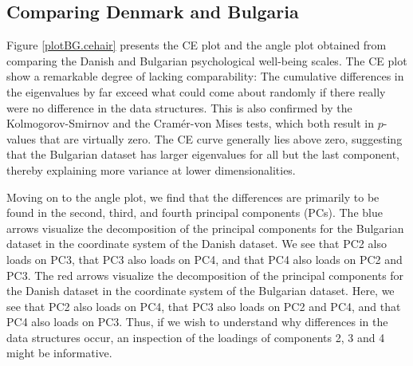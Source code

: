 \documentclass[]{interact}
\theoremstyle{plain}%
\theoremstyle{definition}
\theoremstyle{remark}
\begin{document}
\subsection{Comparing Denmark and Bulgaria}
Figure \ref{plotBG.cehair} presents the CE plot and the angle plot obtained from comparing the Danish and Bulgarian psychological well-being scales. The CE plot show a remarkable degree of lacking comparability: The cumulative differences in the eigenvalues by far exceed what could come about randomly if there really were no difference in the data structures. This is also confirmed by the Kolmogorov-Smirnov and the Cram\'er-von Mises tests, which both result in $p$-values that are virtually zero. The CE curve generally lies above zero, suggesting that the Bulgarian dataset has larger eigenvalues for all but the last component, thereby explaining more variance at lower dimensionalities. 


Moving on to the angle plot, we find that the differences are primarily to be found in the second, third, and fourth principal components (PCs). The blue arrows visualize the decomposition of the principal components for the Bulgarian dataset in the coordinate system of the Danish dataset. We see that PC2 also loads on PC3, that PC3 also loads on PC4, and that PC4 also loads on PC2 and PC3. The red arrows visualize the decomposition of the principal components for the Danish dataset in the coordinate system of the Bulgarian dataset. Here, we see that PC2 also loads on PC4, that PC3 also loads on PC2 and PC4, and that PC4 also loads on PC3. 
Thus, if we wish to understand why differences in the data structures occur, an inspection of the loadings of components 2, 3 and 4 might be informative.
\end{document}
